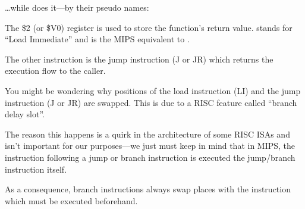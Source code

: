 

\dots while \IDA does it---by their pseudo names:



The \$2 (or \$V0) register is used to store the function's return value.
 stands for ``Load Immediate'' and is the MIPS equivalent to \MOV.

The other instruction is the jump instruction (J or JR) which returns the execution flow to the \gls{caller}.

You might be wondering why positions of the load instruction (LI) and the jump instruction (J or JR) are swapped. This is due to a \ac{RISC} feature called ``branch delay slot''.

The reason this happens is a quirk in the architecture of some RISC \ac{ISA}s and isn't important for our purposes---we just must keep in mind that in MIPS, the instruction following a jump or branch instruction
is executed  the jump/branch instruction itself.

As a consequence, branch instructions always swap places with the instruction which must be executed beforehand.

